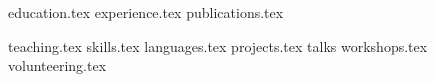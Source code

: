 \documentclass[letterpaper,11pt]{article}
\begin{document}


{education.tex}
{experience.tex}
{publications.tex}


{teaching.tex}
\sidebyside
{{skills.tex}}
{{languages.tex}}
{projects.tex}
{talks}
{workshops.tex}
{volunteering.tex}
\end{document}
